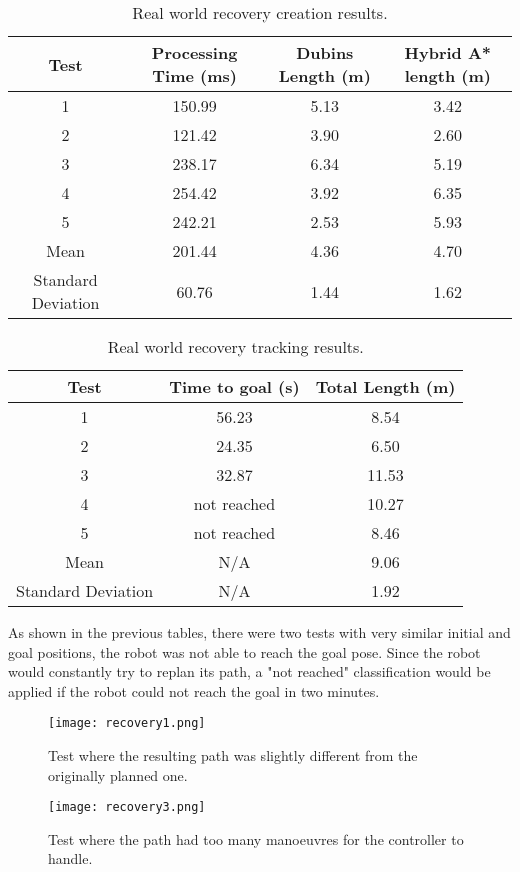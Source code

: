 \begin{table}[H]
    \centering
    \caption{Real world recovery creation results.}
    \begin{tabular}{|c|c|c|c|}
        \hline
        \textbf{Test} & \textbf{Processing Time (ms)} & \textbf{Dubins Length (m)} & \textbf{Hybrid A* length (m)} \\
        \hline
        1 & 150.99 & 5.13 & 3.42 \\
        \hline
        2 & 121.42 & 3.90 & 2.60 \\
        \hline
        3 & 238.17 & 6.34 & 5.19 \\
        \hline
        4 & 254.42 & 3.92 & 6.35 \\
        \hline
        5 & 242.21 & 2.53 & 5.93 \\
        \hline
        Mean & 201.44 & 4.36 & 4.70 \\
        \hline
        Standard Deviation & 60.76 & 1.44 & 1.62 \\
        \hline
    \end{tabular}
    \label{tab:real_recovery_test_results1}
\end{table}
\begin{table}[H]
    \centering
    \caption{Real world recovery tracking results.}
    \begin{tabular}{|c|c|c|}
        \hline
        \textbf{Test} & \textbf{Time to goal (s)} & \textbf{Total Length (m)} \\
        \hline
        1 & 56.23 & 8.54 \\
        \hline
        2 & 24.35 & 6.50 \\
        \hline
        3 & 32.87 & 11.53 \\
        \hline
        4 & not reached & 10.27 \\
        \hline
        5 & not reached & 8.46 \\
        \hline
        Mean & N/A & 9.06 \\
        \hline
        Standard Deviation & N/A & 1.92 \\
        \hline
    \end{tabular}
    \label{tab:real_recovery_test_results2}
\end{table}

As shown in the previous tables, there were two tests with very similar initial and goal positions,
the robot was not able to reach the goal pose. Since the robot would constantly try to replan
its path, a "not reached" classification would be applied if the robot could not reach the goal in
two minutes.
\begin{figure}[h]
    \centering
    \texttt{[image: recovery1.png]}
    \caption{Test where the resulting path was slightly different from the originally planned one.}
    \label{fig:real_recovery_test3}
\end{figure}
\begin{figure}[h]
    \centering
    \texttt{[image: recovery3.png]}
    \caption{Test where the path had too many manoeuvres for the controller to handle.}
    \label{fig:real_recovery_test1}
\end{figure}


